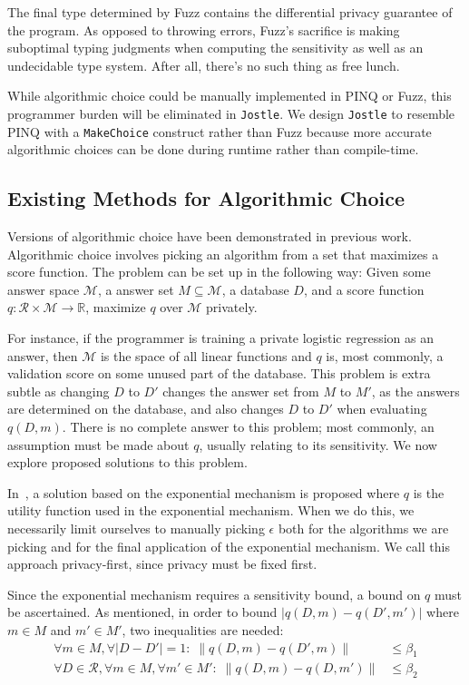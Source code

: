 \documentclass[11pt]{report}
\newcommand{\Jostle}{\texttt{Jostle}}
\renewcommand{\t}[1]{\texttt{#1}}
\begin{document}
The final type determined by Fuzz contains the differential privacy guarantee of the program. As opposed to throwing errors, Fuzz's sacrifice is making suboptimal typing judgments when computing the sensitivity as well as an undecidable type system. After all, there's no such thing as free lunch.

While algorithmic choice could be manually implemented in PINQ or Fuzz, this programmer burden will be eliminated in \Jostle{}. We design \Jostle{} to resemble PINQ with a \t{MakeChoice} construct rather than Fuzz because more accurate algorithmic choices can be done during runtime rather than compile-time.

\subsection{Existing Methods for Algorithmic Choice}

Versions of algorithmic choice have been demonstrated in previous work. Algorithmic choice involves picking an algorithm from a set that maximizes a score function. The problem can be set up in the following way: Given some answer space $\mathcal{M}$, a answer set $M \subseteq \mathcal{M}$, a database $D$, and a score function $q: \mathcal{R} \times \mathcal{M} \rightarrow \mathbb{R}$, maximize $q$ over $\mathcal{M}$ privately.

For instance, if the programmer is training a private logistic regression as an answer, then $\mathcal{M}$ is the space of all linear functions and $q$ is, most commonly, a validation score on some unused part of the database. This problem is extra subtle as changing $D$ to $D'$ changes the answer set from $M$ to $M'$, as the answers are determined on the database, and also changes $D$ to $D'$ when evaluating $q(D, m)$. There is no complete answer to this problem; most commonly, an assumption must be made about $q$, usually relating to its sensitivity. We now explore proposed solutions to this problem.

In~\cite{Chaudhuri:2013}, a solution based on the exponential mechanism is proposed where $q$ is the utility function used in the exponential mechanism. When we do this, we necessarily limit ourselves to manually picking $\epsilon$ both for the algorithms we are picking and for the final application of the exponential mechanism. We call this approach privacy-first, since privacy must be fixed first.

Since the exponential mechanism requires a sensitivity bound, a bound on $q$ must be ascertained. As mentioned, in order to bound $|q(D, m) - q(D', m')|$ where $m \in M$ and $m' \in M'$, two inequalities are needed:
\begin{align*}
\forall m\in M,\forall |D-D'|=1:\;\|q(D, m) - q(D', m)\| &\leq \beta_1 \\
\forall D\in \mathcal{R},\forall m \in M,\forall m'\in M':\;\|q(D, m) -  q(D, m')\| &\leq \beta_2
\end{align*}
\end{document}
